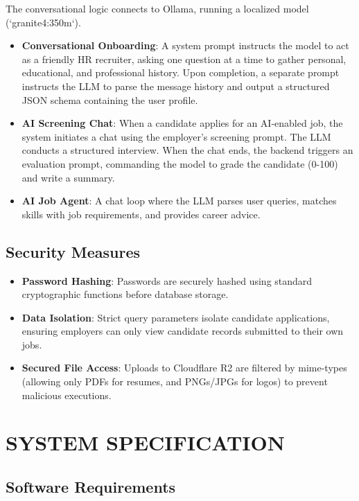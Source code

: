 \documentclass[12pt,a4paper]{report}
\begin{document}
The conversational logic connects to Ollama, running a localized model (`granite4:350m`).
\begin{itemize}
    \item \textbf{Conversational Onboarding}: A system prompt instructs the model to act as a friendly HR recruiter, asking one question at a time to gather personal, educational, and professional history. Upon completion, a separate prompt instructs the LLM to parse the message history and output a structured JSON schema containing the user profile.
    \item \textbf{AI Screening Chat}: When a candidate applies for an AI-enabled job, the system initiates a chat using the employer's screening prompt. The LLM conducts a structured interview. When the chat ends, the backend triggers an evaluation prompt, commanding the model to grade the candidate (0-100) and write a summary.
    \item \textbf{AI Job Agent}: A chat loop where the LLM parses user queries, matches skills with job requirements, and provides career advice.
\end{itemize}

\section{Security Measures}
\begin{itemize}
    \item \textbf{Password Hashing}: Passwords are securely hashed using standard cryptographic functions before database storage.
    \item \textbf{Data Isolation}: Strict query parameters isolate candidate applications, ensuring employers can only view candidate records submitted to their own jobs.
    \item \textbf{Secured File Access}: Uploads to Cloudflare R2 are filtered by mime-types (allowing only PDFs for resumes, and PNGs/JPGs for logos) to prevent malicious executions.
\end{itemize}


\chapter{SYSTEM SPECIFICATION}

\section{Software Requirements}
\end{document}
